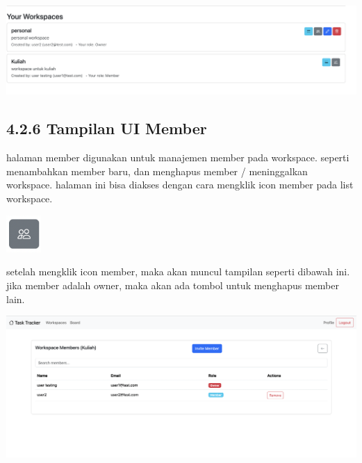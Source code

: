 \begin{center}
  \includegraphics[width=1\textwidth]{assets/ui/workspace_list_row.png}
\end{center}

\subsection*{4.2.6 Tampilan UI Member}
halaman member digunakan untuk manajemen member pada workspace.
seperti menambahkan member baru, dan menghapus member / meninggalkan workspace.
halaman ini bisa diakses dengan cara mengklik icon member pada list workspace.
\begin{center}
  \includegraphics[width=0.1\textwidth]{assets/ui/workspace_member_icon.png}
\end{center}

setelah mengklik icon member, maka akan muncul tampilan seperti dibawah ini.
jika member adalah owner, maka akan ada tombol untuk menghapus member lain.
\begin{center}
  \includegraphics[width=1\textwidth]{assets/ui/list_member.png}
\end{center}

